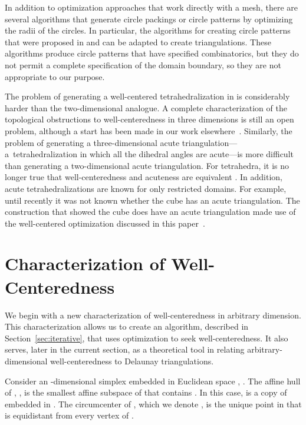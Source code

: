 \documentclass[final]{siamltex}
\begin{document}
In addition to optimization approaches that work directly with a mesh,
there are several algorithms that generate circle packings or circle
patterns by optimizing the radii of the circles.  In particular, the
algorithms for creating circle patterns that were proposed in
\cite{CoSt2003} and \cite{BoSp2004} can be adapted to create
triangulations.  These algorithms produce circle patterns that have
specified combinatorics, but they do not permit a complete
specification of the domain boundary, so they are not appropriate to
our purpose.

The problem of generating a well-centered tetrahedralization in
 is considerably harder than the two-dimensional
analogue. A complete characterization of the topological obstructions
to well-centeredness in three dimensions is still an open problem,
although a start has been made in our work
elsewhere~\cite{VaHiGuRaZh2008}. Similarly, the problem of generating
a three-dimensional acute triangulation---a~tetrahedralization in
which all the dihedral angles are acute---is more difficult than
generating a two-dimensional acute triangulation. For tetrahedra, it
is no longer true that well-centeredness and acuteness are equivalent
\cite[Section 2]{VaHiGu2008}.
In addition, acute tetrahedralizations
are known for only restricted domains.  For example,
until recently it was not
known whether the cube has an acute triangulation.  The
construction that showed the cube does have an acute
triangulation made use of the well-centered optimization
discussed in this paper~\cite{VaHiZhGu2009}.
 

\section{Characterization of Well-Centeredness}

We begin with a new characterization of well-centeredness in arbitrary
dimension. This characterization allows us to create 
an algorithm, described in Section~\ref{sec:iterative},
that uses optimization to seek well-centeredness.
It also serves, later in the current
section, as a theoretical tool in relating arbitrary-dimensional
well-centeredness to Delaunay triangulations.

Consider an -dimensional simplex  embedded in Euclidean
space , .  The affine hull of ,
, is the smallest affine subspace of 
that contains .  In this case,  is a
copy of  embedded in .  The circumcenter of
, which we denote , is the unique point in
 that is equidistant from every vertex of
.
\end{document}
